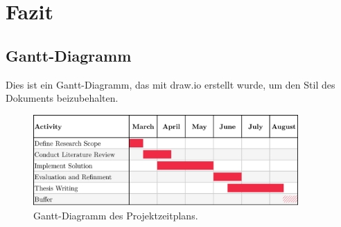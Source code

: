 \chapter{Fazit}
\label{chap:conclusion}

\section{Gantt-Diagramm}

Dies ist ein Gantt-Diagramm, das mit draw.io erstellt wurde, um den Stil des Dokuments beizubehalten.

\begin{figure}[htbp]
    \centering
    \includegraphics[width=0.9\textwidth]{figures/gantt-chart.png}
    \caption{Gantt-Diagramm des Projektzeitplans.}
    \label{fig:gantt-chart}
\end{figure}
